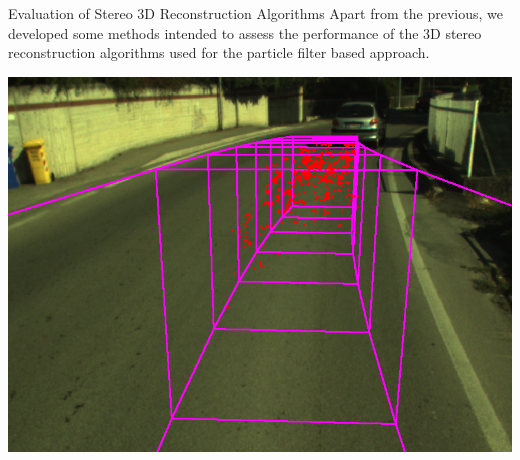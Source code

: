   \begin{frame}{Evaluation of Stereo 3D Reconstruction Algorithms}
    Apart from the previous, we developed some methods intended to assess the performance of the 3D stereo reconstruction algorithms used for the particle filter based approach.
    
    \begin{center}
      \includegraphics[height=.4\columnwidth]{fc}
    \end{center}
    
  \end{frame}
    

